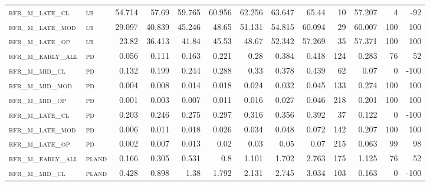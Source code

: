 \begin{landscape}
\begin{center}
\begin{footnotesize}
\begin{longtable}{llrrrrrrrr|rrr}
\textsc{rfr\_m\_late\_cl  } & \textsc{iji       }   & 54.714  & 57.69   & 59.765  & 60.956   & 62.256   & 63.647   & 65.44    & 10     & 57.207        & 4             & -92             \\
\textsc{rfr\_m\_late\_mod } & \textsc{iji       }   & 29.097  & 40.839  & 45.246  & 48.65    & 51.131   & 54.815   & 60.094   & 29     & 60.007        & 100           & 100             \\
\textsc{rfr\_m\_late\_op  } & \textsc{iji       }   & 23.82   & 36.413  & 41.84   & 45.53    & 48.67    & 52.342   & 57.269   & 35     & 57.371        & 100           & 100             \\
\textsc{rfr\_m\_early\_all} & \textsc{pd        }   & 0.056   & 0.111   & 0.163   & 0.221    & 0.28     & 0.384    & 0.418    & 124    & 0.283         & 76            & 52              \\
\textsc{rfr\_m\_mid\_cl   } & \textsc{pd        }   & 0.132   & 0.199   & 0.244   & 0.288    & 0.33     & 0.378    & 0.439    & 62     & 0.07          & 0             & -100            \\
\textsc{rfr\_m\_mid\_mod  } & \textsc{pd        }   & 0.004   & 0.008   & 0.014   & 0.018    & 0.024    & 0.032    & 0.045    & 133    & 0.274         & 100           & 100             \\
\textsc{rfr\_m\_mid\_op   } & \textsc{pd        }   & 0.001   & 0.003   & 0.007   & 0.011    & 0.016    & 0.027    & 0.046    & 218    & 0.201         & 100           & 100             \\
\textsc{rfr\_m\_late\_cl  } & \textsc{pd        }   & 0.203   & 0.246   & 0.275   & 0.297    & 0.316    & 0.356    & 0.392    & 37     & 0.122         & 0             & -100            \\
\textsc{rfr\_m\_late\_mod } & \textsc{pd        }   & 0.006   & 0.011   & 0.018   & 0.026    & 0.034    & 0.048    & 0.072    & 142    & 0.207         & 100           & 100             \\
\textsc{rfr\_m\_late\_op  } & \textsc{pd        }   & 0.002   & 0.007   & 0.013   & 0.02     & 0.03     & 0.05     & 0.07     & 215    & 0.063         & 99            & 98              \\
\textsc{rfr\_m\_early\_all} & \textsc{pland     }   & 0.166   & 0.305   & 0.531   & 0.8      & 1.101    & 1.702    & 2.763    & 175    & 1.125         & 76            & 52              \\
\textsc{rfr\_m\_mid\_cl   } & \textsc{pland     }   & 0.428   & 0.898   & 1.38    & 1.792    & 2.131    & 2.745    & 3.034    & 103    & 0.163         & 0             & -100            \\

\end{longtable}
\end{footnotesize}
\end{center}
\end{landscape}
